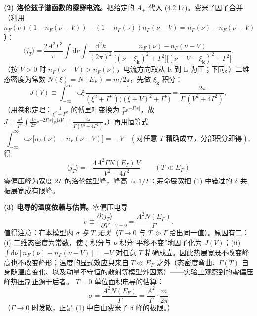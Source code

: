 \textbf{(2) 洛伦兹子谱函数的隧穿电流。}把给定的 $A_\pm$ 代入 (4.2.17)。费米子因子合并（利用 $n_F(\nu)(1-n_F(\nu-V))-(1-n_F(\nu))n_F(\nu-V)=n_F(\nu)-n_F(\nu-V)$）：
\begin{equation*}
\langle j_T\rangle=\frac{2A^2\Gamma^2}{\pi}\int\mathrm{d}\nu\int\frac{\mathrm{d}^2k}{(2\pi)^2}\,
\frac{n_F(\nu)-n_F(\nu-V)}
{\big[(\nu-\xi_{\pmb{k}})^2+\Gamma^2\big]\big[(\nu-V-\xi_{\pmb{k}})^2+\Gamma^2\big]} .
\end{equation*}
（按 $V>0$ 时 $n_F(\nu-V)>n_F(\nu)$，电流方向取从 R 到 L 为正；下同。）二维态密度为常数 $N(\xi)=N(E_F)=m/2\pi$，先做 $\xi_{\pmb{k}}$ 积分：
\begin{equation*}
J(V)\equiv\int_{-\infty}^{\infty}\mathrm{d}\xi\,
\frac{1}{(\xi^2+\Gamma^2)\big((\xi+V)^2+\Gamma^2\big)}
=\frac{2\pi}{\Gamma\,(V^2+4\Gamma^2)},
\end{equation*}
（用卷积定理：$\frac{1}{\xi^2+\Gamma^2}$ 的傅里叶变换为 $\frac{\pi}{\Gamma}\mathrm{e}^{-\Gamma|s|}$，故 $J=\frac{\pi^2}{\Gamma^2}\int\frac{\mathrm{d}s}{2\pi}\mathrm{e}^{-2\Gamma|s|}\mathrm{e}^{\mathrm{i}sV}=\frac{2\pi}{\Gamma(V^2+4\Gamma^2)}$。）再用恒等式
\begin{equation*}
\int_{-\infty}^{\infty}\mathrm{d}\nu\,\big[n_F(\nu)-n_F(\nu-V)\big]=-\,V
\quad(\text{对任意 }T\text{ 精确成立，分部积分即得}),
\end{equation*}
得
\begin{equation*}
\boxed{\;\langle j_T\rangle=-\frac{4A^2\Gamma N(E_F)\,V}{V^2+4\Gamma^2}
\qquad(T\ll E_F)\;}
\end{equation*}
零偏压峰为宽度 $2\Gamma$ 的洛伦兹型峰，峰高 $\propto1/\Gamma$：寿命展宽把 (1) 中错过的 $\delta$ 共振展宽成有限峰。

\textbf{(3) 电导的温度依赖与估算。}零偏压电导
\begin{equation*}
\sigma\equiv\frac{\partial\langle j_T\rangle}{\partial V}\Big|_{V=0}=\frac{A^2N(E_F)}{\Gamma}.
\end{equation*}
值得注意：在本模型内 $\sigma$ \emph{与 $T$ 无关}（$T\to0$ 与 $T\gg\Gamma$ 给出同一值）。原因有二：(i) 二维态密度为常数，使 $\xi$ 积分与 $\nu$ 积分“平移不变”地因子化为 $J(V)$；(ii) $\int\mathrm{d}\nu[n_F(\nu)-n_F(\nu-V)]=-V$ 对任意 $T$ 精确成立。因此热展宽既不改变峰高也不改变峰形；温度的显式效应只来自 $T\ll E_F$ 之外（态密度弯曲、$\Gamma(T)$ 自身随温度变化、以及动量不守恒的散射等模型外因素）——实验上观察到的零偏压峰热压制正源于后者。
$T=0$ 单位面积电导的估算：
\begin{equation*}
\boxed{\;\sigma=\frac{A^2N(E_F)}{\Gamma}=\frac{A^2}{\Gamma}\cdot\frac{m}{2\pi}\;}
\end{equation*}
（$\Gamma\to0$ 时发散，正是 (1) 中自由费米子 $\delta$ 峰的极限。）

